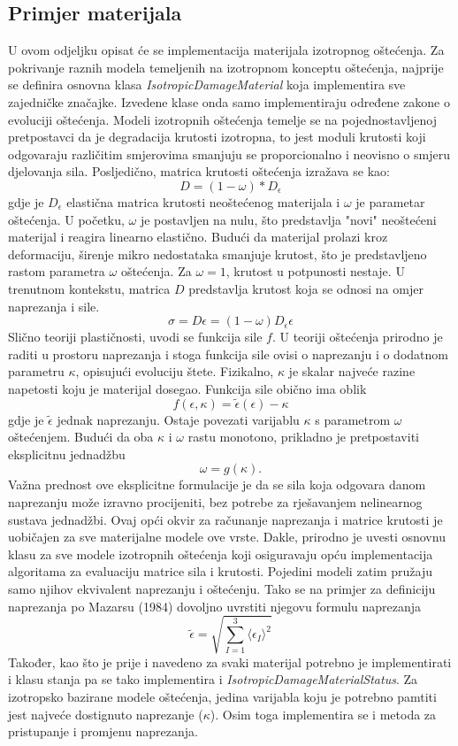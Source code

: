\documentclass[a4paper,twoside,12pt]{memoir} %
\begin{document}
\subsection{Primjer materijala}
U ovom odjeljku opisat će se implementacija materijala izotropnog oštećenja. Za pokrivanje raznih modela temeljenih na izotropnom konceptu oštećenja, najprije se definira osnovna klasa \textit{IsotropicDamageMaterial} koja implementira sve zajedničke značajke. Izvedene klase onda samo implementiraju određene zakone o evoluciji oštećenja.
Modeli izotropnih oštećenja temelje se na pojednostavljenoj pretpostavci da je degradacija krutosti izotropna, to jest moduli krutosti koji odgovaraju različitim smjerovima smanjuju se proporcionalno i neovisno o smjeru djelovanja sila. Posljedično, matrica krutosti oštećenja izražava se kao:
$$ D = (1 - \omega) * D_\epsilon$$
gdje je $D_\epsilon$ elastična matrica krutosti neoštećenog materijala i $\omega$ je parametar oštećenja. U početku, $\omega$ je postavljen na nulu, što predstavlja "novi" neoštećeni materijal i reagira linearno elastično. Budući da materijal prolazi kroz deformaciju, širenje mikro nedostataka smanjuje krutost, što je predstavljeno rastom parametra $\omega$ oštećenja. Za $\omega = 1$, krutost u potpunosti nestaje. U trenutnom kontekstu, matrica $D$ predstavlja krutost koja se odnosi na omjer naprezanja i sile.
$$\sigma = D \epsilon = (1 - \omega) D_\epsilon \epsilon$$
Slično teoriji plastičnosti, uvodi se funkcija sile $f$. U teoriji oštećenja prirodno je raditi u prostoru naprezanja i stoga funkcija sile ovisi o naprezanju i o dodatnom parametru $\kappa$, opisujući evoluciju štete. Fizikalno, $\kappa$ je skalar najveće razine napetosti koju je materijal dosegao. Funkcija sile obično ima oblik 
$$f(\epsilon, \kappa) = \widetilde{\epsilon} (\epsilon) - \kappa$$
gdje je $\widetilde{\epsilon}$ jednak naprezanju. Ostaje povezati varijablu $\kappa$ s parametrom $\omega$ oštećenjem. Budući da oba $\kappa$ i $\omega$ rastu monotono, prikladno je pretpostaviti eksplicitnu jednadžbu
$$ \omega = g(\kappa) .$$
Važna prednost ove eksplicitne formulacije je da se sila koja odgovara danom naprezanju može izravno procijeniti, bez potrebe za rješavanjem nelinearnog sustava jednadžbi.
Ovaj opći okvir za računanje naprezanja i matrice krutosti je uobičajen za sve materijalne modele ove vrste. Dakle, prirodno je uvesti osnovnu klasu za sve modele izotropnih oštećenja koji osiguravaju opću implementacija algoritama za evaluaciju matrice sila i krutosti. Pojedini modeli zatim pružaju samo njihov ekvivalent naprezanju i oštećenju. Tako se na primjer za definiciju naprezanja po Mazarsu (1984) dovoljno uvrstiti njegovu formulu naprezanja
$$ \widetilde{\epsilon} = \sqrt{\sum^3_{I=1} \langle \epsilon_I \rangle^2 }$$
Također, kao što je prije i navedeno za svaki materijal potrebno je implementirati i klasu stanja pa se tako implementira i \textit{IsotropicDamageMaterialStatus}. Za izotropsko bazirane modele oštećenja, jedina varijabla koju je potrebno pamtiti jest najveće dostignuto naprezanje ($\kappa$). Osim toga implementira se i metoda za pristupanje i promjenu naprezanja.
\end{document}
